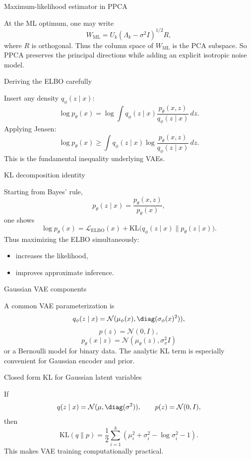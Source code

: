 \documentclass[aspectratio=169]{beamer}
\begin{document}
\begin{frame}{Maximum-likelihood estimator in PPCA}

At the ML optimum, one may write
\[
W_{\mathrm{ML}} = U_k (\Lambda_k - \sigma^2 I)^{1/2} R,
\]
where \(R\) is orthogonal.
Thus the column space of \(W_{\mathrm{ML}}\) is the PCA subspace.
So PPCA preserves the principal directions while adding an explicit isotropic noise model.

\end{frame}

\begin{frame}{Deriving the ELBO carefully}

Insert any density \(q_\phi(z\mid x)\):
\[
\log p_\theta(x)
=
\log \int q_\phi(z\mid x)\frac{p_\theta(x,z)}{q_\phi(z\mid x)}\,dz.
\]
Applying Jensen:
\[
\log p_\theta(x)
\ge
\int q_\phi(z\mid x)\log \frac{p_\theta(x,z)}{q_\phi(z\mid x)}\,dz.
\]
This is the fundamental inequality underlying VAEs.

\end{frame}

\begin{frame}{KL decomposition identity}

Starting from Bayes' rule,
\[
p_\theta(z\mid x)=\frac{p_\theta(x,z)}{p_\theta(x)},
\]
one shows
\[
\log p_\theta(x)
=
\mathcal{L}_{\mathrm{ELBO}}(x)
+
\mathrm{KL}\bigl(q_\phi(z\mid x)\|p_\theta(z\mid x)\bigr).
\]
Thus maximizing the ELBO simultaneously:
\begin{itemize}
\item increases the likelihood,
\item improves approximate inference.
\end{itemize}

\end{frame}

\begin{frame}{Gaussian VAE components}

A common VAE parameterization is
\[
q_\phi(z\mid x)=\mathcal{N}(\mu_\phi(x), \diag(\sigma_\phi(x)^2)),
\]
\[
p(z)=\mathcal{N}(0,I),
\]
\[
p_\theta(x\mid z)=\mathcal{N}(\mu_\theta(z), \sigma_x^2 I)
\]
or a Bernoulli model for binary data.
The analytic KL term is especially convenient for Gaussian encoder and prior.

\end{frame}

\begin{frame}{Closed form KL for Gaussian latent variables}

If
\[
q(z\mid x)=\mathcal{N}(\mu,\diag(\sigma^2)),
\qquad
p(z)=\mathcal{N}(0,I),
\]
then
\[
\mathrm{KL}(q\|p)
=
\frac{1}{2}\sum_{i=1}^k \left(\mu_i^2+\sigma_i^2-\log \sigma_i^2 -1\right).
\]
This makes VAE training computationally practical.

\end{frame}
\end{document}
